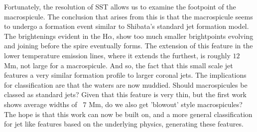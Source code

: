 Fortunately, the resolution of SST allows us to examine the footpoint of the macrospicule.
The conclusion that arises from this is that the macrospicule seems to undergo a formation event similar to Shibata's standard jet formation model.
The brightenings evident in the H$\alpha$, show too much smaller brightpoints evolving and joining before the spire eventually forms.
The extension of this feature in the lower temperature emission lines, where it extends the furthest, is roughly $12$ Mm, not large for a macrospicule.
And so, the fact that this small scale jet features a very similar formation profile to larger coronal jets.
The implications for classification are that the waters are now muddied.
Should macrospicules be classed as standard jets?
Given that this feature is very thin, but the first work shows average widths of ~$7$ Mm, do we also get 'blowout' style macrospicules?
The hope is that this work can now be built on, and a more general classification for jet like features based on the underlying physics, generating these features.  
 



